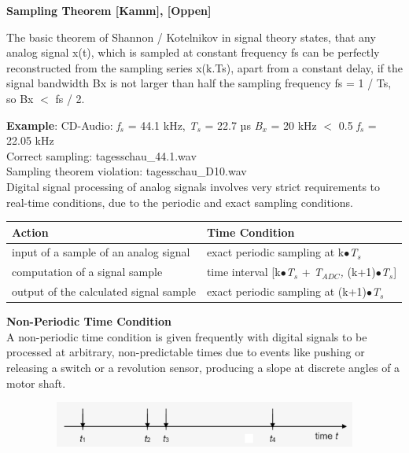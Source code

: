 {\rot\bf Sampling Theorem [Kamm], [Oppen]}

\begin{tcolorbox}[colback=blue!5!white,colframe=blue!75!black]
  The basic theorem of Shannon / Kotelnikov in signal theory states, that any analog signal x(t), which is sampled at constant frequency fs can be perfectly reconstructed from the sampling series x(k.Ts), apart from a constant delay, if the signal bandwidth Bx is not larger than half the sampling frequency fs = 1 / Ts, so Bx $<$ fs / 2.
\end{tcolorbox}

\textbf{Example}: CD-Audio: \textit{f}${}_{s}$ = 44.1 kHz, \textit{T}${}_{s}$ = 22.7 µs  \textit{B${}_{x}$} = 20 kHz $\mathrm{<}$ 0.5 \textit{f}${}_{s}$ = 22.05 kHz \\

Correct sampling:       tagesschau\_44.1.wav \\
Sampling theorem violation:  tagesschau\_D10.wav\\

Digital signal processing of analog signals involves very strict requirements to real-time conditions, due to the periodic and exact sampling conditions.\\

\begin{tabular}{|p{2.2in}|p{1.9in}|} \hline 
\textbf{Action} & \textbf{Time Condition} \\ \hline 
input of a sample of an analog signal    & exact periodic sampling at  k$\mathrm{\bullet}$\textit{T}${}_{s}$ \\ \hline 
computation of a signal sample  & time interval [k$\mathrm{\bullet}$\textit{T}${}_{s}$ + \textit{T${}_{ADC}$,} (k+1)$\mathrm{\bullet}$\textit{T}${}_{s}$] \\ \hline 
output of the calculated signal sample & exact periodic sampling at  (k+1)$\mathrm{\bullet}$\textit{T}${}_{s}$ \\ \hline 
\end{tabular}
\newpage

{\rot\bf Non-Periodic Time Condition}\\

A non-periodic time condition is given frequently with digital signals to be processed at arbitrary, non-predictable times due to events like pushing or releasing a switch or a revolution sensor, producing a slope at discrete angles of a motor shaft.\\

	\begin{figure}[h]
    \centering
    \includegraphics[width=12cm, height=1.5cm]{Images/image67.png}
    \label{fig:Fig }
    \end{figure}

